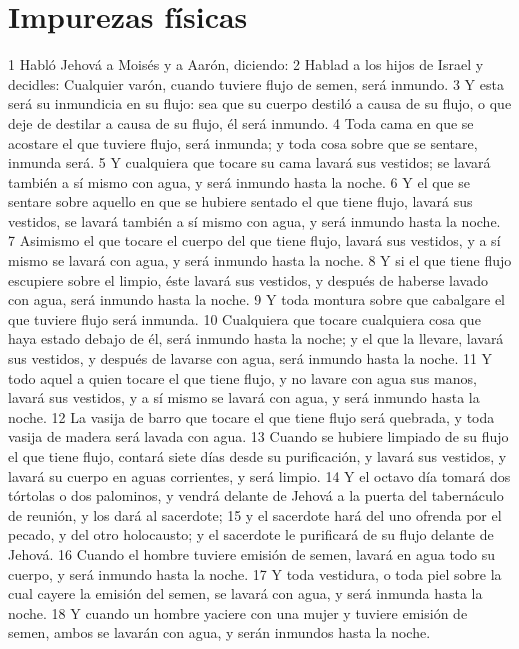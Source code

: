 \section{Impurezas físicas}

1 Habló Jehová a Moisés y a Aarón, diciendo:
2 Hablad a los hijos de Israel y decidles: Cualquier varón, cuando tuviere flujo de semen, será inmundo.
3 Y esta será su inmundicia en su flujo: sea que su cuerpo destiló a causa de su flujo, o que deje de destilar a causa de su flujo, él será inmundo.
4 Toda cama en que se acostare el que tuviere flujo, será inmunda; y toda cosa sobre que se sentare, inmunda será.
5 Y cualquiera que tocare su cama lavará sus vestidos; se lavará también a sí mismo con agua, y será inmundo hasta la noche.
6 Y el que se sentare sobre aquello en que se hubiere sentado el que tiene flujo, lavará sus vestidos, se lavará también a sí mismo con agua, y será inmundo hasta la noche.
7 Asimismo el que tocare el cuerpo del que tiene flujo, lavará sus vestidos, y a sí mismo se lavará con agua, y será inmundo hasta la noche.
8 Y si el que tiene flujo escupiere sobre el limpio, éste lavará sus vestidos, y después de haberse lavado con agua, será inmundo hasta la noche.
9 Y toda montura sobre que cabalgare el que tuviere flujo será inmunda.
10 Cualquiera que tocare cualquiera cosa que haya estado debajo de él, será inmundo hasta la noche; y el que la llevare, lavará sus vestidos, y después de lavarse con agua, será inmundo hasta la noche.
11 Y todo aquel a quien tocare el que tiene flujo, y no lavare con agua sus manos, lavará sus vestidos, y a sí mismo se lavará con agua, y será inmundo hasta la noche.
12 La vasija de barro que tocare el que tiene flujo será quebrada, y toda vasija de madera será lavada con agua.
13 Cuando se hubiere limpiado de su flujo el que tiene flujo, contará siete días desde su purificación, y lavará sus vestidos, y lavará su cuerpo en aguas corrientes, y será limpio.
14 Y el octavo día tomará dos tórtolas o dos palominos, y vendrá delante de Jehová a la puerta del tabernáculo de reunión, y los dará al sacerdote;
15 y el sacerdote hará del uno ofrenda por el pecado, y del otro holocausto; y el sacerdote le purificará de su flujo delante de Jehová.
16 Cuando el hombre tuviere emisión de semen, lavará en agua todo su cuerpo, y será inmundo hasta la noche.
17 Y toda vestidura, o toda piel sobre la cual cayere la emisión del semen, se lavará con agua, y será inmunda hasta la noche.
18 Y cuando un hombre yaciere con una mujer y tuviere emisión de semen, ambos se lavarán con agua, y serán inmundos hasta la noche.

